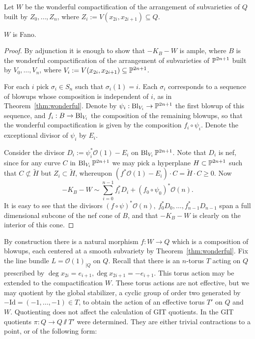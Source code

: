 Let \(W\) be the wonderful compactification of the arrangement of subvarieties of \(Q\) built by \(Z_0,\dots,Z_n\), where \(Z_i := V(x_{2i},x_{2i+1}) \subseteq Q\).
\begin{lemma}
\(W\) is Fano.
\end{lemma}
\begin{proof}
By adjunction it is enough to show that \(-K_B - W\) is ample, where \(B\) is the wonderful compactification of the arrangement of subvarieties of \(\mathbb{P}^{2n+1}\) built by \(V_0,\dots,V_n\), where \(V_i := V(x_{2i},x_{2i+1}) \subseteq \mathbb{P}^{2n+1}\).

For each \(i\) pick \(\sigma_i \in S_n\) such that \(\sigma_i(1) = i\). Each \(\sigma_i\) corresponds to a sequence of blowups whose composition is independent of \(i\), as in Theorem~\ref{thm:wonderful}. Denote by \( \psi_i: \operatorname{Bl}_{V_i} \to \mathbb{P}^{2n+1}\) the first blowup of this sequence, and \(f_i: B \to \operatorname{Bl}_{V_i}\) the composition of the remaining blowups, so that the wonderful compactification is given by the composition \(f_i \circ \psi_i\). Denote the exceptional divisor of \(\psi_i\) by \(E_i\).

Consider the divisor \(D_i := \psi_i^* \mathcal{O}(1) - E_i\) on \(\operatorname{Bl}_{V_i} \mathbb{P}^{2n+1}\). Note that \(D_i\) is nef, since for any curve \(C\) in \(\operatorname{Bl}_{V_i} \mathbb{P}^{2n+1}\) we may pick a hyperplane \(H \subset \mathbb{P}^{2n+1} \) such that \(C \not\subset \tilde{H}\) but \(Z_i \subset \tilde{H}\), whereupon \((f^* \mathcal{O}(1) - E_i) \cdot C = \tilde{H} \cdot C \ge 0\).
Now
\[
-K_B - W \sim  \sum_{i=0}^{n-1} f_i^* D_i + (f_0 \circ \psi_0)^* \mathcal{O}(n).
\]
It is easy to see that the divisors \((f \circ \psi)^* \mathcal{O}(n), \ f_0^* D_0, \dots, f_{n-1}^* D_{n-1} \) span a full dimensional subcone of the nef cone of \(B\), and that \(-K_B - W\) is clearly on the interior of this cone.
\end{proof}
By construction there is a natural morphism \(f: W \to Q\) which is a composition of blowups, each centered at a smooth subvariety by Theorem~\ref{thm:wonderful}. Fix the line bundle \(L = \mathcal{O}(1)_{|Q} \) on \(Q\). Recall that there is an \(n\)-torus \(T\) acting on \(Q\) prescribed by \(\deg x_{2i} = e_{i+1}, \deg x_{2i+1} = -e_{i+1}\). This torus action may be extended to the compactification \(W\). These torus actions are not effective, but we may quotient by the global stabilizer, a cyclic group of order  two generated by \(-\text{Id} = (-1,\dots,-1) \in T\), to obtain the action of an effective torus \(T'\) on \(Q\) and \(W\). Quotienting does not affect the calculation of GIT quotients. In \cite{suess18-2} the GIT quotients \(\pi: Q \to Q \sslash T'\) were determined. They are either trivial contractions to a point, or of the following form:
